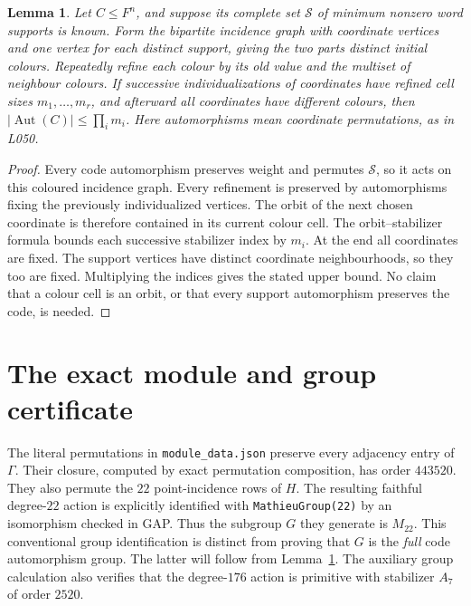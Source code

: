 \documentclass[11pt,a4paper]{article}
\newtheorem{lemma}{Lemma}
\newcommand{\Aut}{\operatorname{Aut}}
\begin{document}
\begin{lemma}\label{lem:support}
Let $C\leq F^n$, and suppose its complete set $\mathcal S$ of minimum
nonzero word supports is known. Form the bipartite incidence graph with
coordinate vertices and one vertex for each distinct support, giving the
two parts distinct initial colours. Repeatedly refine each colour by its
old value and the multiset of neighbour colours. If successive
individualizations of coordinates have refined cell sizes
$m_1,\ldots,m_r$, and afterward all coordinates have different colours,
then $|\Aut(C)|\leq\prod_i m_i$. Here automorphisms mean coordinate
permutations, as in L050.
\end{lemma}
\begin{proof}
Every code automorphism preserves weight and permutes $\mathcal S$, so it
acts on this coloured incidence graph. Every refinement is preserved by
automorphisms fixing the previously individualized vertices. The orbit of
the next chosen coordinate is therefore contained in its current colour
cell. The orbit--stabilizer formula bounds each successive stabilizer
index by $m_i$. At the end all coordinates are fixed. The support vertices
have distinct coordinate neighbourhoods, so they too are fixed. Multiplying
the indices gives the stated upper bound. No claim that a colour cell is
an orbit, or that every support automorphism preserves the code, is needed.
\end{proof}

\section{The exact module and group certificate}
The literal permutations in \texttt{module\_data.json} preserve every
adjacency entry of $\Gamma$. Their closure, computed by exact permutation
composition, has order $443520$. They also permute the $22$ point-incidence
rows of $H$. The resulting faithful degree-$22$ action is explicitly
identified with \texttt{MathieuGroup(22)} by an isomorphism checked in GAP.
Thus the subgroup $G$ they generate is $M_{22}$. This conventional group
identification is distinct from proving that $G$ is the \emph{full} code
automorphism group. The latter will follow from Lemma~\ref{lem:support}.
The auxiliary group calculation also verifies that the degree-$176$ action
is primitive with stabilizer $A_7$ of order $2520$.
\end{document}
